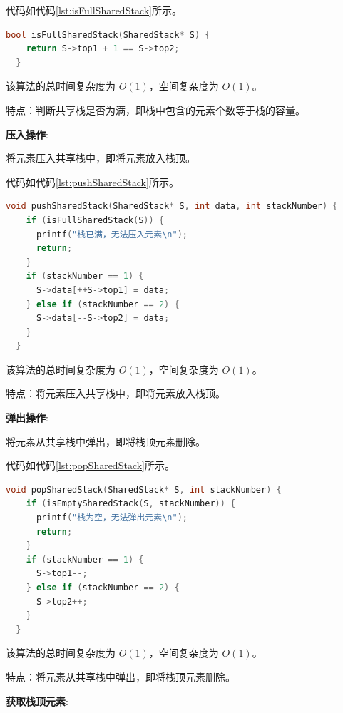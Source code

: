 \documentclass[lang=cn,newtx,10pt,scheme=chinese]{elegantbook}
\begin{document}
代码如代码\ref{lst:isFullSharedStack}所示。

\begin{lstlisting}[language=C++, caption={判断共享栈是否为满示例代码}, label={lst:isFullSharedStack}]
  bool isFullSharedStack(SharedStack* S) {
    return S->top1 + 1 == S->top2;
  }

\end{lstlisting}

该算法的总时间复杂度为 $O(1)$，空间复杂度为 $O(1)$。

特点：判断共享栈是否为满，即栈中包含的元素个数等于栈的容量。

\textbf{压入操作}:

将元素压入共享栈中，即将元素放入栈顶。

代码如代码\ref{lst:pushSharedStack}所示。

\begin{lstlisting}[language=C++, caption={压入共享栈示例代码}, label={lst:pushSharedStack}]
  void pushSharedStack(SharedStack* S, int data, int stackNumber) {
    if (isFullSharedStack(S)) {
      printf("栈已满，无法压入元素\n");
      return;
    }
    if (stackNumber == 1) {
      S->data[++S->top1] = data;
    } else if (stackNumber == 2) {
      S->data[--S->top2] = data;
    }
  }

\end{lstlisting}

该算法的总时间复杂度为 $O(1)$，空间复杂度为 $O(1)$。

特点：将元素压入共享栈中，即将元素放入栈顶。

\textbf{弹出操作}:

将元素从共享栈中弹出，即将栈顶元素删除。

代码如代码\ref{lst:popSharedStack}所示。

\begin{lstlisting}[language=C++, caption={弹出共享栈示例代码}, label={lst:popSharedStack}]
  void popSharedStack(SharedStack* S, int stackNumber) {
    if (isEmptySharedStack(S, stackNumber)) {
      printf("栈为空，无法弹出元素\n");
      return;
    }
    if (stackNumber == 1) {
      S->top1--;
    } else if (stackNumber == 2) {
      S->top2++;
    }
  }

\end{lstlisting}

该算法的总时间复杂度为 $O(1)$，空间复杂度为 $O(1)$。

特点：将元素从共享栈中弹出，即将栈顶元素删除。

\textbf{获取栈顶元素}:
\end{document}

